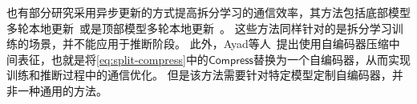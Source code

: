 也有部分研究采用异步更新的方式提高拆分学习的通信效率，其方法包括底部模型多轮本地更新~\cite{fu2022cache_vfl}或是顶部模型多轮本地更新~\cite{chen2021async_split}。
%
这些方法同样针对的是拆分学习训练的场景，并不能应用于推断阶段。
%
此外，Ayad等人~\cite{ayad202vfl}提出使用自编码器压缩中间表征，也就是将\eqref{eq:split-compress}中的$\mathsf{Compress}$替换为一个自编码器，从而实现训练和推断过程中的通信优化。
%
但是该方法需要针对特定模型定制自编码器，并非一种通用的方法。